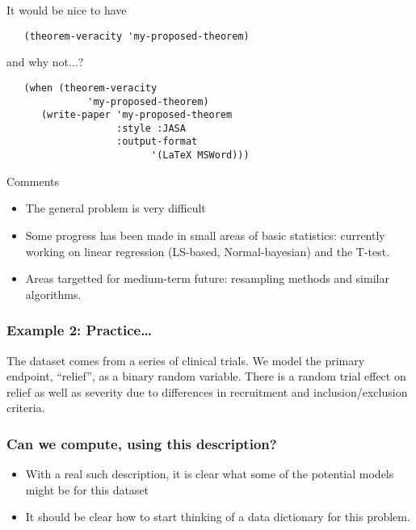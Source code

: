 \documentclass{beamer}
\begin{document}
\begin{frame}[fragile]{It would be nice to have}
\begin{verbatim}
   (theorem-veracity 'my-proposed-theorem)
\end{verbatim}
\end{frame}

\begin{frame}[fragile]{and why not...?}
\begin{verbatim}
   (when (theorem-veracity
              'my-proposed-theorem)
      (write-paper 'my-proposed-theorem
                   :style :JASA
                   :output-format
                         '(LaTeX MSWord)))
\end{verbatim}
\end{frame}

\begin{frame}{Comments}
  \begin{itemize}
  \item The general problem is very difficult
  \item Some progress has been made in small areas of basic
    statistics: currently working on linear regression (LS-based,
    Normal-bayesian) and the T-test.
  \item Areas targetted for medium-term future: resampling methods and
    similar algorithms.
  \end{itemize}

\end{frame}

\begin{frame}
  \frametitle{Example 2: Practice\ldots} 
  \label{example2}
  The dataset comes from a series of clinical trials.  We model the
  primary endpoint, ``relief'', as a binary random variable.  There is
  a random trial effect on relief as well as severity due to
  differences in recruitment and inclusion/exclusion criteria.
\end{frame}

\begin{frame}
  \frametitle{Can we compute, using this description?}
  \begin{itemize}
  \item With a real such description, it is clear what some of the
    potential models might be for this dataset
  \item It should be clear how to start thinking of a data dictionary
    for this problem.
  \end{itemize}
\end{frame}
\end{document}
